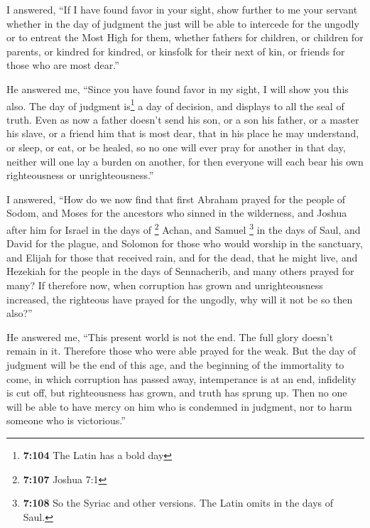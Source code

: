  I answered, ``If I have found favor in your sight, show
further to me your servant whether in the day of judgment the just will
be able to intercede for the ungodly or to entreat the Most High for
them,  whether fathers for children, or children for
parents, or kindred for kindred, or kinsfolk for their next of kin, or
friends for those who are most dear.''

 He answered me, ``Since you have found favor in my
sight, I will show you this also. The day of judgment is\footnote{\textbf{7:104}
  The Latin has a bold day} a day of decision, and displays to all the
seal of truth. Even as now a father doesn't send his son, or a son his
father, or a master his slave, or a friend him that is most dear, that
in his place he may understand, or sleep, or eat, or be healed,
 so no one will ever pray for another in that day,
neither will one lay a burden on another, for then everyone will each
bear his own righteousness or unrighteousness.''

 I answered, ``How do we now find that first Abraham
prayed for the people of Sodom, and Moses for the ancestors who sinned
in the wilderness,  and Joshua after him for Israel in
the days of \footnote{\textbf{7:107} Joshua 7:1} Achan, 
and Samuel \footnote{\textbf{7:108} So the Syriac and other versions.
  The Latin omits in the days of Saul.} in the days of Saul, and David
for the plague, and Solomon for those who would worship in the
sanctuary,  and Elijah for those that received rain, and
for the dead, that he might live,  and Hezekiah for the
people in the days of Sennacherib, and many others prayed for many?
 If therefore now, when corruption has grown and
unrighteousness increased, the righteous have prayed for the ungodly,
why will it not be so then also?''

 He answered me, ``This present world is not the end.
The full glory doesn't remain in it. Therefore those who were able
prayed for the weak.  But the day of judgment will be
the end of this age, and the beginning of the immortality to come, in
which corruption has passed away,  intemperance is at an
end, infidelity is cut off, but righteousness has grown, and truth has
sprung up.  Then no one will be able to have mercy on
him who is condemned in judgment, nor to harm someone who is
victorious.''

